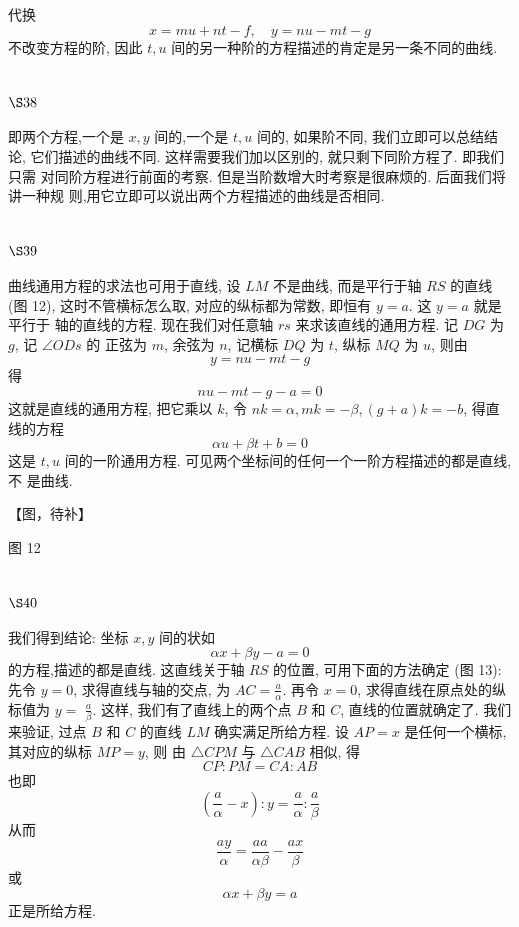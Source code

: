 代换
\[
x=m u+n t-f, \quad y=n u-m t-g
\]
不改变方程的阶, 因此 $t, u$ 间的另一种阶的方程描述的肯定是另一条不同的曲线.

\section{$\S 38$}

即两个方程,一个是 $x, y$ 间的,一个是 $t, u$ 间的, 如果阶不同, 我们立即可以总结结 论, 它们描述的曲线不同. 这样需要我们加以区别的, 就只剩下同阶方程了. 即我们只需 对同阶方程进行前面的考察. 但是当阶数增大时考察是很麻烦的. 后面我们将讲一种规 则,用它立即可以说出两个方程描述的曲线是否相同.

\section{$\S 39$}

曲线通用方程的求法也可用于直线, 设 $L M$ 不是曲线, 而是平行于轴 $R S$ 的直线 (图 12), 这时不管横标怎么取, 对应的纵标都为常数, 即恒有 $y=a$. 这 $y=a$ 就是平行于 轴的直线的方程. 现在我们对任意轴 $r s$ 来求该直线的通用方程. 记 $D G$ 为 $g$, 记 $\angle O D s$ 的 正弦为 $m$, 余弦为 $n$, 记横标 $D Q$ 为 $t$, 纵标 $M Q$ 为 $u$, 则由
\[
y=n u-m t-g
\]
得
\[
n u-m t-g-a=0
\]
这就是直线的通用方程, 把它乘以 $k$, 令 $n k=\alpha, m k=-\beta,(g+a) k=-b$, 得直线的方程
\[
\alpha u+\beta t+b=0
\]
这是 $t, u$ 间的一阶通用方程. 可见两个坐标间的任何一个一阶方程描述的都是直线, 不 是曲线. 


【图，待补】

图 12

\section{$\S 40$}

我们得到结论: 坐标 $x, y$ 间的状如
\[
\alpha x+\beta y-a=0
\]
的方程,描述的都是直线. 这直线关于轴 $R S$ 的位置, 可用下面的方法确定 (图 13): 先令 $y=0$, 求得直线与轴的交点, 为 $A C=\frac{a}{\alpha}$. 再令 $x=0$, 求得直线在原点处的纵标值为 $y=$ $\frac{a}{\beta}$. 这样, 我们有了直线上的两个点 $B$ 和 $C$, 直线的位置就确定了. 我们来验证, 过点 $B$ 和 $C$ 的直线 $L M$ 确实满足所给方程. 设 $A P=x$ 是任何一个横标,其对应的纵标 $M P=y$, 则 由 $\triangle C P M$ 与 $\triangle C A B$ 相似, 得
\[
C P: P M=C A: A B
\]
也即
\[
\left(\frac{a}{\alpha}-x\right): y=\frac{a}{\alpha}: \frac{a}{\beta}
\]
从而
\[
\frac{a y}{\alpha}=\frac{a a}{\alpha \beta}-\frac{a x}{\beta}
\]
或
\[
\alpha x+\beta y=a
\]
正是所给方程.


